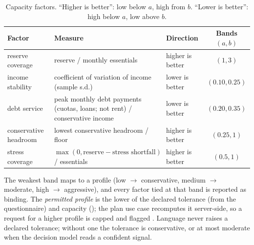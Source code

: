 \begin{table}[htbp]
  \centering
  \small
  \begin{tabularx}{\linewidth}{@{}>{\raggedright\arraybackslash}p{24mm}>{\raggedright\arraybackslash}Xp{18mm}c@{}}
    \toprule
    Factor & Measure & Direction & Bands $(a, b)$ \\
    \midrule
    reserve coverage & reserve / monthly essentials & higher is better & $(1, 3)$ \\
    income stability & coefficient of variation of income (sample s.d.) & lower is better & $(0.10, 0.25)$ \\
    debt service & peak monthly debt payments (cuotas, loans; not rent) / conservative income & lower is better & $(0.20, 0.35)$ \\
    conservative headroom & lowest conservative headroom / floor & higher is better & $(0.25, 1)$ \\
    stress coverage & $\max(0, \text{reserve} - \text{stress shortfall})$ / essentials & higher is better & $(0.5, 1)$ \\
    \bottomrule
  \end{tabularx}
  \caption{Capacity factors. ``Higher is better'': low below $a$, high from $b$. ``Lower is better'': high below $a$, low above $b$.}\label{tab:capacity}
\end{table}

The weakest band maps to a profile (low $\to$ conservative, medium $\to$ moderate, high $\to$ aggressive), and every
factor tied at that band is reported as binding. The \emph{permitted profile} is the lower of the declared tolerance
(from the questionnaire) and capacity (); the plan use case recomputes it server-side, so
a request for a higher profile is capped and flagged . Language never raises a declared tolerance;
without one the tolerance is conservative, or at most moderate when the decision model reads a confident signal.

